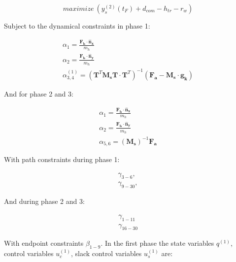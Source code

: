 \documentclass[default,iicol]{sn-jnl}
\begin{document}
{\begin{equation}
     maximize\ (y_s^{(2)}(t_F) + d_{com} - h_{tr} - r_w)
\end{equation} 

Subject to the dynamical constraints in phase 1:

\begin{equation}
\begin{array}{c}
        \alpha_{1} = \frac{\mathbf{F_h}\cdot \mathbf{\hat n_x}}{m_h}\\
        \alpha_{2} = \frac{\mathbf{F_h}\cdot \mathbf{\hat n_y}}{m_h}\\
        \alpha_{3,4}^{(1)} =   \left(\mathbf{T}^T \mathbf{M_s} \mathbf{T} \cdot  \mathbf{T}^T\right)^{-1} (\mathbf{F_a} - \mathbf{M_s} \cdot \mathbf{g_k})
\end{array}
\end{equation}

And for phase 2 and 3:

\begin{equation}
    \begin{array}{c}
        \alpha_{1} = \frac{\mathbf{F_h}\cdot \mathbf{\hat n_x}}{m_h}\\
        \alpha_{2} = \frac{\mathbf{F_h}\cdot \mathbf{\hat n_y}}{m_h}\\ 
        \alpha_{5,6} = (\mathbf{M_s})^{-1}\mathbf{F_a}
    \end{array}
\end{equation}

With path constraints during phase 1:

\begin{equation}
    \begin{array}{c}
         \gamma_{3-6},  \\
         \gamma_{9-30},
    \end{array}
\end{equation}

And during phase 2 and 3:

\begin{equation}
    \begin{array}{c}
         \gamma_{1-11}  \\
         \gamma_{16-30}
    \end{array}
\end{equation}

With endpoint constraints $\beta_{1-9}$.
In the first phase the state variables $q^{(1)}$, control variables $u_c^{(1)}$, slack control variables $u_s^{(1)}$ are:

}
\end{document}
